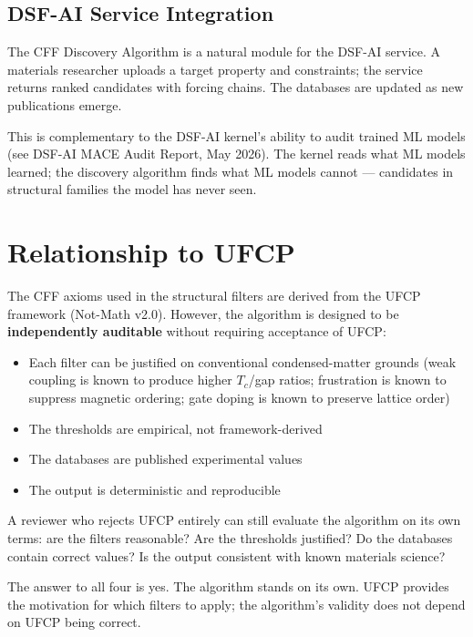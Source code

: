 \documentclass[11pt, a4paper]{article}
\begin{document}
\subsection{DSF-AI Service Integration}

The CFF Discovery Algorithm is a natural module for the DSF-AI
service. A materials researcher uploads a target property and
constraints; the service returns ranked candidates with forcing
chains. The databases are updated as new publications emerge.

This is complementary to the DSF-AI kernel's ability to audit
trained ML models (see DSF-AI MACE Audit Report, May 2026). The
kernel reads what ML models learned; the discovery algorithm finds
what ML models cannot --- candidates in structural families the
model has never seen.

\section{Relationship to UFCP}

The CFF axioms used in the structural filters are derived from
the UFCP framework (Not-Math v2.0). However, the algorithm is
designed to be \textbf{independently auditable} without requiring
acceptance of UFCP:

\begin{itemize}[nosep]
  \item Each filter can be justified on conventional
        condensed-matter grounds (weak coupling is known to
        produce higher $T_c$/gap ratios; frustration is known
        to suppress magnetic ordering; gate doping is known to
        preserve lattice order)
  \item The thresholds are empirical, not framework-derived
  \item The databases are published experimental values
  \item The output is deterministic and reproducible
\end{itemize}

A reviewer who rejects UFCP entirely can still evaluate the
algorithm on its own terms: are the filters reasonable? Are the
thresholds justified? Do the databases contain correct values?
Is the output consistent with known materials science?

The answer to all four is yes. The algorithm stands on its own.
UFCP provides the motivation for which filters to apply; the
algorithm's validity does not depend on UFCP being correct.
\end{document}
